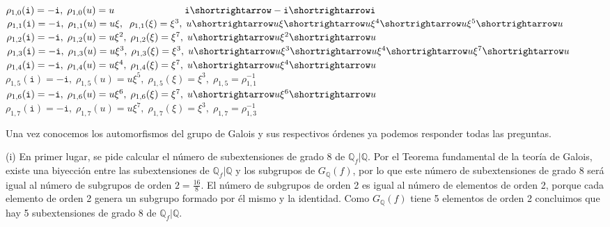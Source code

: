 \begin{flushleft}
$\rho_{1,0}(\mathtt{i})=-\mathtt{i},\; \rho_{1,0}(u)=u \;\;\;\;\;\;\;\;\;\;\;\;\;\;\;\;\;\;\;\;\;\;\;\;\;\;\mathtt{i}\shortrightarrow -\mathtt{i}\shortrightarrow \mathtt{i}$\\

$\rho_{1,1}(\mathtt{i})=-\mathtt{i},\;\rho_{1,1}(u)=u\xi,\;\;\rho_{1,1}(\xi)=\xi^3,\;
u\shortrightarrow u\xi\shortrightarrow u\xi^4\shortrightarrow u\xi^5\shortrightarrow u$\\

$\rho_{1,2}(\mathtt{i})=-\mathtt{i},\;\rho_{1,2}(u)=u\xi^2,\;\rho_{1,2}(\xi)=\xi^7,\;
u\shortrightarrow u\xi^2\shortrightarrow u$\\

$\rho_{1,3}(\mathtt{i})=-\mathtt{i},\;\rho_{1,3}(u)=u\xi^3,\;\rho_{1,3}(\xi)=\xi^3,\; u\shortrightarrow u\xi^3\shortrightarrow u\xi^4\shortrightarrow u\xi^7\shortrightarrow u$\\

$\rho_{1,4}(\mathtt{i})=-\mathtt{i},\;\rho_{1,4}(u)=u\xi^4,\;\rho_{1,4}(\xi)=\xi^7,\;
u\shortrightarrow u\xi^4\shortrightarrow u$\\

$\rho_{1,5}(\mathtt{i})=-\mathtt{i},\;\rho_{1,5}(u)=u\xi^5,\;\rho_{1,5}(\xi)=\xi^3,\; \rho_{1,5}=\rho_{1,1}^{-1}$\\

$\rho_{1,6}(\mathtt{i})=-\mathtt{i},\;\rho_{1,6}(u)=u\xi^6,\;\rho_{1,6}(\xi)=\xi^7,\;
u\shortrightarrow u\xi^6\shortrightarrow u$\\

$\rho_{1,7}(\mathtt{i})=-\mathtt{i},\;\rho_{1,7}(u)=u\xi^7,\;\rho_{1,7}(\xi)=\xi^3,\; \rho_{1,7}=\rho_{1,3}^{-1}$
\end{flushleft}
Una vez conocemos los automorfismos del grupo de Galois y sus respectivos órdenes ya podemos responder todas las preguntas. 

(i) En primer lugar, se pide calcular el número de subextensiones de grado 8 de $\mathbb{Q}_f|\mathbb{Q}$. Por el Teorema fundamental de la teoría de Galois, existe una biyección entre las subextensiones de $\mathbb{Q}_f|\mathbb{Q}$ y los subgrupos de $G_\mathbb{Q}(f)$, por lo que este número de subextensiones de grado 8 será igual al número de subgrupos de orden $2=\frac{16}{8}$. El número de subgrupos de orden 2 es igual al número de elementos de orden 2, porque cada elemento de orden 2 genera un subgrupo formado por él mismo y la identidad. Como $G_\mathbb{Q}(f)$ tiene 5 elementos de orden 2 concluimos que hay 5 subextensiones de grado 8 de $\mathbb{Q}_f|\mathbb{Q}$. 

